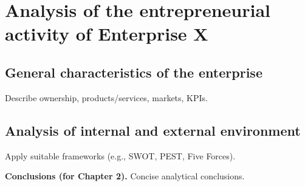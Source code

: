 \chapter{Analysis of the entrepreneurial activity of Enterprise X}
\section{General characteristics of the enterprise}
Describe ownership, products/services, markets, KPIs.

\section{Analysis of internal and external environment}
Apply suitable frameworks (e.g., SWOT, PEST, Five Forces).

\noindent\textbf{Conclusions (for Chapter 2).} Concise analytical conclusions.
